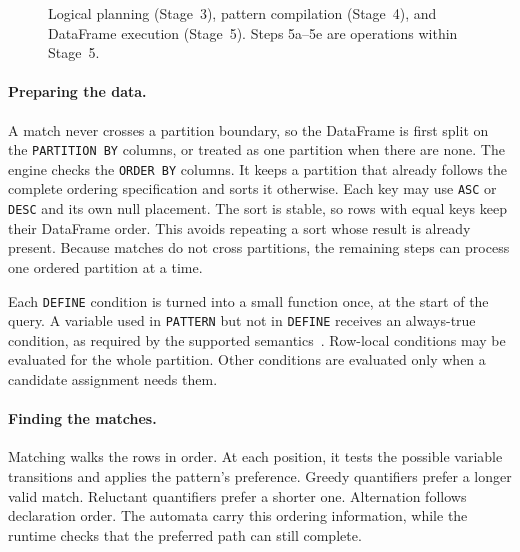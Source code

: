 \begin{figure}[htbp]
  \caption[Planning, compilation, and DataFrame execution]{Logical
    planning (Stage~3), pattern compilation (Stage~4), and DataFrame
    execution (Stage~5).  Steps 5a--5e are operations within Stage~5.}
  \label{fig:exec-pipeline}
\end{figure}

\paragraph{Preparing the data.}
A match never crosses a partition boundary, so the DataFrame is first
split on the \texttt{PARTITION BY} columns, or treated as one partition
when there are none.  The engine checks the \texttt{ORDER BY} columns.
It keeps a partition that already follows the complete ordering
specification and sorts it otherwise.  Each key may use \texttt{ASC} or
\texttt{DESC} and its own null placement.  The sort is stable, so rows
with equal keys keep their DataFrame order.  This avoids repeating a
sort whose result is already present.  Because matches do not cross partitions,
the remaining steps can process one ordered partition at a time.

Each \texttt{DEFINE} condition is turned into a small function once, at
the start of the query.  A variable used in \texttt{PATTERN} but not in
\texttt{DEFINE} receives an always-true condition, as required by the
supported semantics~\cite{trino2022}.  Row-local conditions may be
evaluated for the whole partition.  Other conditions are evaluated only
when a candidate assignment needs them.

\paragraph{Finding the matches.}
Matching walks the rows in order.  At each position, it tests the
possible variable transitions and applies the pattern's preference.
Greedy quantifiers prefer a longer valid match.  Reluctant quantifiers
prefer a shorter one.  Alternation follows declaration order.  The
automata carry this ordering information, while the runtime checks that
the preferred path can still complete.

